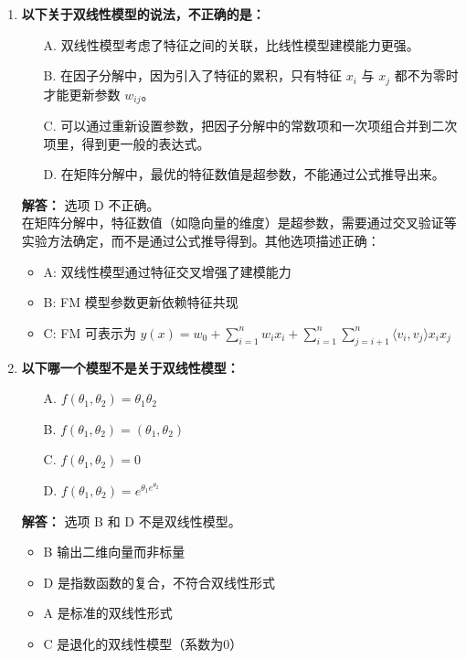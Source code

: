 \documentclass[a4paper,12pt]{book}
\begin{document}
\begin{enumerate}[label=\arabic*.]
    \item \textbf{以下关于双线性模型的说法，不正确的是：}
    \begin{itemize}
        \item[A.] 双线性模型考虑了特征之间的关联，比线性模型建模能力更强。
        \item[B.] 在因子分解中，因为引入了特征的累积，只有特征 \( x_i \) 与 \( x_j \) 都不为零时才能更新参数 \( w_{ij} \)。
        \item[C.] 可以通过重新设置参数，把因子分解中的常数项和一次项组合并到二次项里，得到更一般的表达式。
        \item[D.] 在矩阵分解中，最优的特征数值是超参数，不能通过公式推导出来。
    \end{itemize}
    
    \textbf{解答：} 选项 D 不正确。\\
    在矩阵分解中，特征数值（如隐向量的维度）是超参数，需要通过交叉验证等实验方法确定，而不是通过公式推导得到。其他选项描述正确：
    \begin{itemize}
        \item A: 双线性模型通过特征交叉增强了建模能力
        \item B: FM 模型参数更新依赖特征共现
        \item C: FM 可表示为 \(\hat{y}(x) = w_0 + \sum_{i=1}^n w_i x_i + \sum_{i=1}^n \sum_{j=i+1}^n \langle v_i, v_j \rangle x_i x_j\)
    \end{itemize}

    \item \textbf{以下哪一个模型不是关于双线性模型：}
    \begin{itemize}
        \item[A.] \( f(\theta_1, \theta_2) = \theta_1 \theta_2 \)
        \item[B.] \( f(\theta_1, \theta_2) = (\theta_1, \theta_2) \)
        \item[C.] \( f(\theta_1, \theta_2) = 0 \)
        \item[D.] \( f(\theta_1, \theta_2) = e^{\theta_1 e^{\theta_2}} \)
    \end{itemize}
    
    \textbf{解答：} 选项 B 和 D 不是双线性模型。\\
    \begin{itemize}
        \item B 输出二维向量而非标量
        \item D 是指数函数的复合，不符合双线性形式
        \item A 是标准的双线性形式
        \item C 是退化的双线性模型（系数为0）
    \end{itemize}


\end{enumerate}
\end{document}
